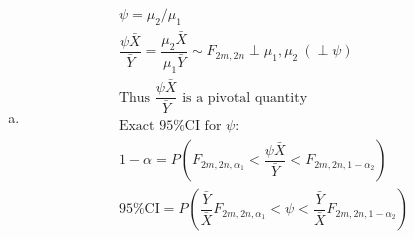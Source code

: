 \documentclass{article}
\newcommand{\al}{\alpha}
\newcommand{\Bx}{\bar{X}}
\newcommand{\By}{\bar{Y}}
\begin{document}
\begin{flushleft}
\begin{enumerate}[(a)]
	\item 
\begin{multline*}\\
\psi=\mu_2/\mu_1\\
\dfrac{\psi \Bx}{\By}=\dfrac{\mu_2 \Bx}{\mu_1\By}\sim F_{2m,2n}\perp \mu_1,\mu_2 \ (\perp \psi)\\
\text{Thus } \dfrac{\psi \Bx}{\By} \text{ is a pivotal quantity}\\
\text{Exact 95\% CI for } \psi:\\
1-\al=P(F_{2m,2n,\al_1}<\dfrac{\psi \Bx}{\By}<F_{2m,2n,1-\al_2})\\
\text{95\% CI}=P(\dfrac{\By}{\Bx}F_{2m,2n,\al_1}<\psi<\dfrac{\By}{\Bx}F_{2m,2n,1-\al_2})\\
\end{multline*}

\end{enumerate}


\end{flushleft}
\end{document}
